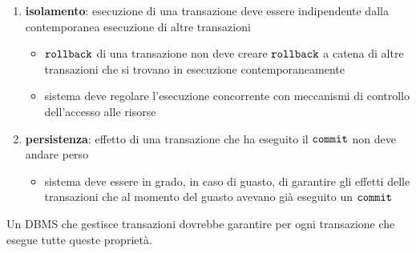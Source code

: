 \begin{enumerate}[itemsep=\smallskipamount]
  Questo implica:
  \begin{itemize}[label=$\diamond$, itemsep=\smallskipamount]
    \item verifica immediata:
    \begin{itemize}[itemsep=\smallskipamount]
      \item fatta nel corso della transazione
      \item viene abortita solo l’ultima operazione e il sistema restituisce all’applicazione una segnalazione d’errore
      \item applicazione può reagire alla violazione
    \end{itemize}
    \item verifica differita:
    \begin{itemize}[itemsep=\smallskipamount]
      \item  al $\verb|commit|$ se un vincolo di integrità viene violato, la transazione viene abortita senza possibilità da parte dell’applicazione di reagire alla violazione
    \end{itemize}
  \end{itemize}
  \item \textcolor{azzurrino}{\textbf{isolamento}}: esecuzione di una transazione deve essere indipendente dalla contemporanea esecuzione di altre transazioni
  \begin{itemize}[label=$\diamond$, itemsep=\smallskipamount]
    \item $\verb|rollback|$ di una transazione non deve creare $\verb|rollback|$ a catena di altre transazioni che si trovano in esecuzione contemporaneamente
    \item  sistema deve regolare l’esecuzione concorrente con meccanismi di controllo dell’accesso alle risorse
  \end{itemize}
  \item \textcolor{azzurrino}{\textbf{persistenza}}: effetto di una transazione che ha eseguito il $\verb|commit|$ non deve andare perso
  \begin{itemize}[label=$\diamond$, itemsep=\smallskipamount]
    \item sistema deve essere in grado, in caso di guasto, di garantire gli effetti delle transazioni che al momento del guasto avevano già eseguito un $\verb|commit|$
  \end{itemize}
\end{enumerate}

\smallskip
Un DBMS che gestisce transazioni dovrebbe garantire per ogni transazione che esegue tutte queste proprietà.

